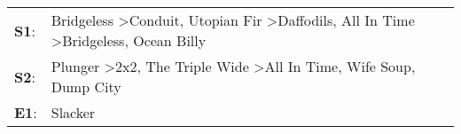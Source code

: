 \begin{supertabular}{p{0.03\textwidth}p{0.92\textwidth}}
 \textbf{S1}:  &  Bridgeless\textsuperscript{} \textgreater \enspace Conduit\textsuperscript{}, \enspace Utopian Fir\textsuperscript{} \textgreater \enspace Daffodils\textsuperscript{}, \enspace All In Time\textsuperscript{} \textgreater \enspace Bridgeless\textsuperscript{}, \enspace Ocean Billy\textsuperscript{}  \enspace  \\
 \textbf{S2}:  &                                                          Plunger\textsuperscript{} \textgreater \enspace 2x2\textsuperscript{}, \enspace The Triple Wide\textsuperscript{} \textgreater \enspace All In Time\textsuperscript{}, \enspace Wife Soup\textsuperscript{}, \enspace Dump City\textsuperscript{}  \enspace  \\
 \textbf{E1}:  &                                                                                                                                                                                                                                                                                  Slacker\textsuperscript{}  \enspace  \\
\end{supertabular}
